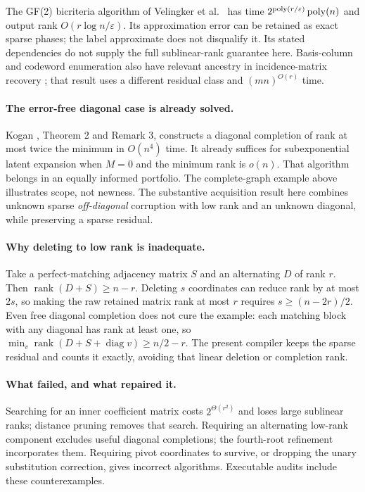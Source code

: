 \documentclass[11pt,a4paper]{article}
\theoremstyle{remark}\newtheorem{remark}[theorem]{Remark}
\newcommand{\rank}{\operatorname{rank}}\newcommand{\diag}{\operatorname{diag}}
\begin{document}
The GF(2) bicriteria algorithm of Velingker et al.\
\cite{velingker} has time
$2^{\operatorname{poly}(r/\varepsilon)}\operatorname{poly}(n)$ and output rank
$O(r\log n/\varepsilon)$. Its approximation error can be
retained as exact sparse phases; the label approximate
does not disqualify it. Its stated dependencies do not
supply the full sublinear-rank guarantee here. Basis-column
and codeword enumeration also have relevant ancestry in
incidence-matrix recovery \cite{incidence}; that result uses
a different residual class and $(mn)^{O(r)}$ time.

\paragraph{The error-free diagonal case is already solved.}
Kogan \cite{kogan}, Theorem 2 and Remark 3, constructs a
diagonal completion of rank at most twice the minimum
in $O(n^4)$ time. It already suffices for subexponential
latent expansion when $M=0$ and the minimum rank is $o(n)$.
That algorithm belongs in an equally informed portfolio.
The complete-graph example above illustrates scope, not
newness. The substantive acquisition result here combines
unknown sparse \emph{off-diagonal} corruption with low rank
and an unknown diagonal, while preserving a sparse residual.

\paragraph{Why deleting to low rank is inadequate.}
Take a perfect-matching adjacency matrix $S$ and an
alternating $D$ of rank $r$. Then
$\rank(D+S)\ge n-r$. Deleting $s$ coordinates can reduce
rank by at most $2s$, so making the raw retained matrix
rank at most $r$ requires $s\ge(n-2r)/2$.
Even free diagonal completion does not cure the example:
each matching block with any diagonal has rank at least one,
so $\min_v\rank(D+S+\diag v)\ge n/2-r$.
The present compiler keeps the sparse residual and counts it
exactly, avoiding that linear deletion or completion rank.

\paragraph{What failed, and what repaired it.}
Searching for an inner coefficient matrix costs
$2^{\Theta(r^2)}$ and loses large sublinear ranks; distance
pruning removes that search. Requiring an alternating
low-rank component excludes useful diagonal completions;
the fourth-root refinement incorporates them. Requiring
pivot coordinates to survive, or dropping the unary
substitution correction, gives incorrect algorithms.
Executable audits include these counterexamples.
\end{document}
